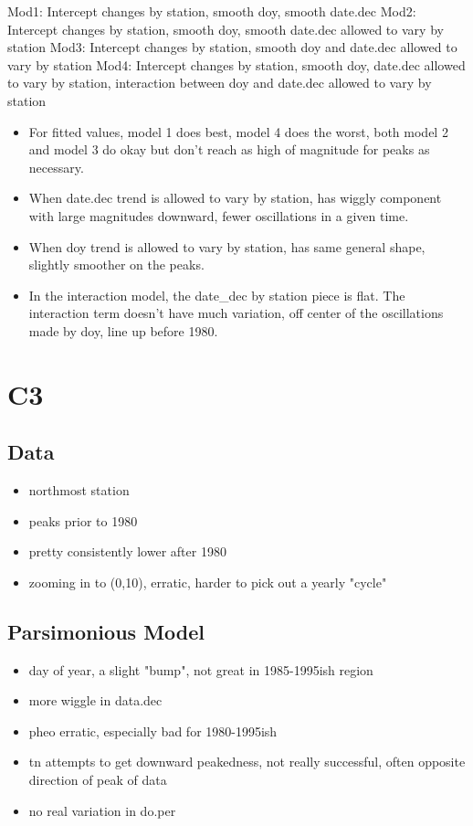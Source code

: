 \documentclass[12pt]{amsart}
\begin{document}
Mod1: Intercept changes by station, smooth doy, smooth date.dec
Mod2: Intercept changes by station, smooth doy, smooth date.dec allowed to vary by station
Mod3: Intercept changes by station, smooth doy and date.dec allowed to vary by station
Mod4: Intercept changes by station, smooth doy, date.dec allowed to vary by station, interaction between doy and date.dec allowed to vary by station

\begin{itemize}
\item For fitted values, model 1 does best, model 4 does the worst, both model 2 and model 3 do okay but don't reach as high of magnitude for peaks as necessary.
\item When date.dec trend is allowed to vary by station, has wiggly component with large magnitudes downward, fewer oscillations in a given time.
\item When doy trend is allowed to vary by station, has same general shape, slightly smoother on the peaks. 
\item In the interaction model, the date_dec by station piece is flat. The interaction term doesn't have much variation, off center of the oscillations made by doy, line up before 1980. 
\end{itemize}

\section{C3}
\subsection{Data}
\begin{itemize}
\item northmost station
\item peaks prior to 1980
\item pretty consistently lower after 1980
\item zooming in to (0,10), erratic, harder to pick out a yearly "cycle"
\end{itemize}
\subsection{Parsimonious Model}
\begin{itemize}
\item day of year, a slight "bump", not great in 1985-1995ish region
\item more wiggle in data.dec
\item pheo erratic, especially bad for 1980-1995ish
\item tn attempts to get downward peakedness, not really successful, often opposite direction of peak of data
\item no real variation in do.per
\end{itemize}
\end{document}
